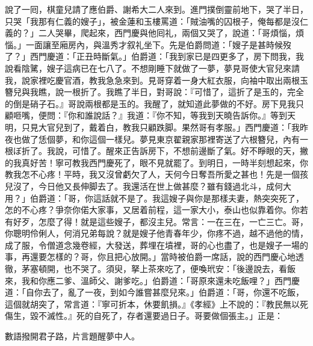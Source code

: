 說了一囘，棋童兒請了應伯爵、謝希大二人來到。進門撲倒靈前地下，{}哭了半日，只哭「我那有仁義的嫂子」，{}被金蓮和玉樓罵道：「賊油嘴的囚根子，俺每都是沒仁義的？」二人哭畢，爬起來，西門慶與他囘礼，兩個又哭了，說道：「哥煩惱，煩惱。」一面讓至廂房內，與溫秀才叙礼坐下。先是伯爵問道：「嫂子是甚時候歿了？」西門慶道：「正丑時斷氣。」伯爵道：「我到家已是四更多了，房下問我，我說看陰騭，嫂子這病已在七八了。不想剛睡下就做了一夢，{}夢見哥使大官兒來請我，說家裡吃慶官酒，教我急急來到。見哥穿着一身大紅衣服，向袖中取出兩根玉簪兒與我瞧，說一根折了。我瞧了半日，對哥說：『可惜了，這折了是玉的，完全的倒是硝子石。』{}哥說兩根都是玉的。{}我醒了，就知道此夢做的不好。房下見我只顧咂嘴，便問：『你和誰說話？』我道：『你不知，等我到天曉告訴你。』等到天明，只見大官兒到了，戴着白，教我只顧跌脚。{}果然哥有孝服。」西門慶道：「我昨夜也做了恁個夢，和你這個一樣兒。夢見東京翟親家那裡寄送了六根簪兒，內有一根ぼ折了。我說，可惜了。醒來正告訴房下，不想前邊斷了氣。好不睜眼的天，{}撇的我真好苦！寧可教我西門慶死了，眼不見就罷了。到明日，一時半刻想起來，你教我怎不心疼！平時，我又沒曾虧欠了人，{}天何今日奪吾所愛之甚也！先是一個孩兒沒了，今日他又長伸脚去了。我還活在世上做甚麼？雖有錢過北斗，成何大用？」伯爵道：「哥，你這話就不是了。我這嫂子與你是那樣夫妻，熱突突死了，怎的不心疼？爭奈你偌大家事，又居着前程，這一家大小，泰山也似靠着你。你若有好歹，怎麼了得！就是這些嫂子，都沒主兒。常言：一在三在，一亡三亡。哥，你聰明伶俐人，何消兄弟每說？就是嫂子他青春年少，你疼不過，越不過他的情，成了服，令僧道念幾卷經，大發送，葬埋在墳裡，哥的心也盡了，也是嫂子一場的事，再還要怎樣的？哥，你且把心放開。」{}當時被伯爵一席話，說的西門慶心地透徹，茅塞頓開，也不哭了。須臾，拏上茶來吃了，便喚玳安：「後邊說去，看飯來，我和你應二爹、溫師父、謝爹吃。」伯爵道：「哥原來還未吃飯哩？」西門慶道：「自你去了，亂了一夜，到如今誰嘗甚麼兒來。」伯爵道：「哥，你還不吃飯，這個就胡突了，常言道：『寧可折本，休要飢損。』《孝經》上不說的：『教民無以死傷生，毀不滅性。』{}死的自死了，存者還要過日子。哥要做個張主。」正是：

\begin{myquote} 
數語撥開君子路，片言題醒夢中人。
\end{myquote} 

